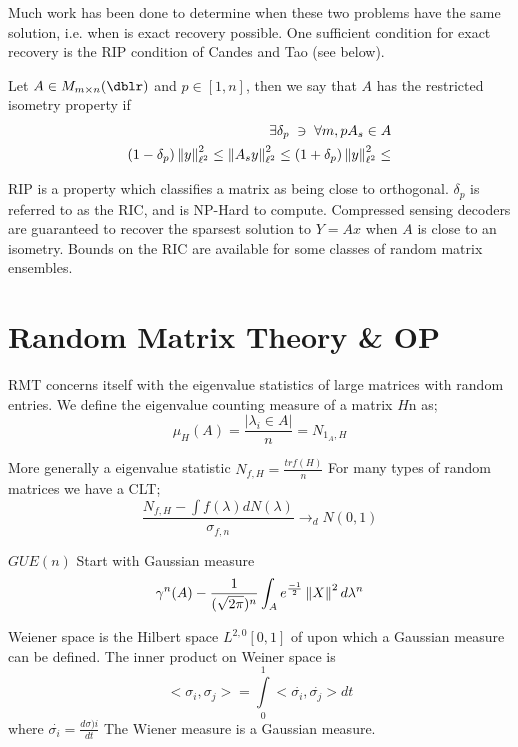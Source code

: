 Much work has been done to determine when these two problems have the same solution, i.e. when is exact recovery possible. One  sufficient condition for exact recovery is the RIP condition of Candes and Tao (see below).

\begin{defn}
Let $A \in M_{m \times n}(\dblr)$ and $p \in [1,n]$, then we say that $A$ has the restricted isometry property if
\begin{eqnarray*}
  \exists \delta_p \; \ni \; \forall m,p A_s \in A \\
  (1 - \delta_p) \left\Vert y\right\Vert_{\ell^2}^2 \leq   \left\Vert A_s y\right\Vert_{\ell^2}^2 \leq (1 + \delta_p) \left\Vert y\right\Vert_{\ell^2}^2 \leq
\end{eqnarray*}
\end{defn}
RIP is a property which classifies a matrix as being close to orthogonal.  $\delta_p$ is referred to as the RIC, and is NP-Hard to compute.  Compressed sensing decoders are guaranteed to recover the sparsest solution to $Y = A x$ when $A$ is close to an isometry. Bounds on the RIC are available for some classes of random matrix ensembles.


\section{Random Matrix Theory \& OP}

RMT concerns itself with the eigenvalue statistics of large matrices with random entries. We define the eigenvalue counting measure of a matrix $H$n as;
\begin{equation*}
\mu_H (A) = \frac{| \lambda_i \in A |}{n} = N_{1_A, H}
\end{equation*}

More generally a eigenvalue statistic $N_{f,H}  = \frac{tr f(H)}{n}$
For many types of random matrices we have a CLT;
\begin{equation*}
\frac{N_{f,H}-\int f(\lambda) dN(\lambda)}{\sigma_{f,n}} \rightarrow_d N(0,1)
\end{equation*}

$GUE(n)$ Start with Gaussian measure
\begin{equation*}
\gamma^n(A) - \frac{1}{(\sqrt{2 \pi} )^n} \int_A e^ \frac{-1}{2} \left\Vert X\right\Vert^2 d \lambda^n
\end{equation*}

Weiener space is the Hilbert space $L^{2,0}[0,1]$ of upon which a Gaussian measure can be defined. The inner product on Weiner space is
\begin{equation*}
<\sigma_i,\sigma_j> = \int\limits_{0}^{1} <\overset{\cdot}{\sigma_i},\overset{\cdot}{\sigma_j}> dt
\end{equation*}
where $\overset{\cdot}{\sigma_i} = \frac{d \sigma)i}{dt}$
The Wiener measure is a Gaussian measure.

